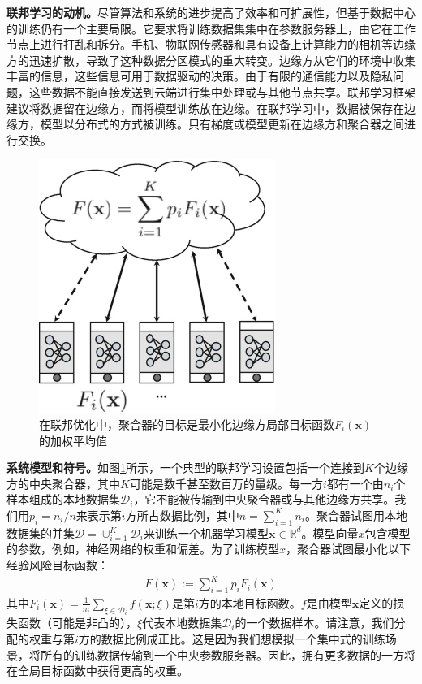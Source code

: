 \textbf{联邦学习的动机。}尽管算法和系统的进步提高了效率和可扩展性，但基于数据中心的训练仍有一个主要局限。它要求将训练数据集集中在参数服务器上，由它在工作节点上进行打乱和拆分。手机、物联网传感器和具有设备上计算能力的相机等边缘方的迅速扩散，导致了这种数据分区模式的重大转变。边缘方从它们的环境中收集丰富的信息，这些信息可用于数据驱动的决策。由于有限的通信能力以及隐私问题，这些数据不能直接发送到云端进行集中处理或与其他节点共享。联邦学习框架建议将数据留在边缘方，而将模型训练放在边缘。在联邦学习中，数据被保存在边缘方，模型以分布式的方式被训练。只有梯度或模型更新在边缘方和聚合器之间进行交换。

\begin{figure}[h]
	\centering
	\includegraphics{images/chap06/Fig1}
	\caption{在联邦优化中，聚合器的目标是最小化边缘方局部目标函数$F_{i}(\bm{x})$的加权平均值}
	\label{fig:6.1}
\end{figure}

\textbf{系统模型和符号。}如图\ref{fig:6.1}所示，一个典型的联邦学习设置包括一个连接到$K$个边缘方的中央聚合器，其中$K$可能是数千甚至数百万的量级。每一方$i$都有一个由$n_{i}$个样本组成的本地数据集$\mathcal{D}_{i}$，它不能被传输到中央聚合器或与其他边缘方共享。我们用$p_{i} = n_{i}/n$来表示第$i$方所占数据比例，其中$n=\sum_{i=1}^{K}n_{i}$。聚合器试图用本地数据集的并集$\mathcal{D} = \cup_{i=1}^{K}\mathcal{D}_{i}$来训练一个机器学习模型$\bm{x} \in \mathbb{R}^{d}$。模型向量$x$包含模型的参数，例如，神经网络的权重和偏差。为了训练模型$x$，聚合器试图最小化以下经验风险目标函数：
\begin{align}
	F(\bm{x}) := \sum_{i=1}^{K}p_{i}F_{i}(\bm{x})
\end{align}
其中$F_{i}(\bm{x}) = \frac{1}{n_{i}}\sum_{\xi \in \mathcal{D}_{i}} f(\bm{x};\xi)$是第$i$方的本地目标函数。$f$是由模型$\bm{x}$定义的损失函数（可能是非凸的），$\xi$代表本地数据集$\mathcal{D}_{i}$的一个数据样本。请注意，我们分配的权重与第$i$方的数据比例成正比。这是因为我们想模拟一个集中式的训练场景，将所有的训练数据传输到一个中央参数服务器。因此，拥有更多数据的一方将在全局目标函数中获得更高的权重。

